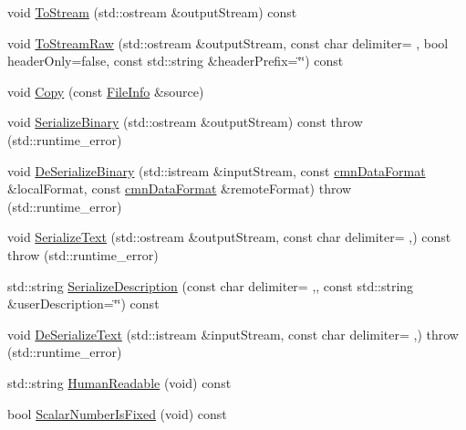 \begin{DoxyCompactItemize}
void \hyperlink{classsvl_filter_source_text_file_types_1_1_file_info_a74c475c29ecd42ea46fc55573ffb888d}{To\+Stream} (std\+::ostream \&output\+Stream) const 
\item 
void \hyperlink{classsvl_filter_source_text_file_types_1_1_file_info_a7bd65d4afd72c9a162758856e66ac8b3}{To\+Stream\+Raw} (std\+::ostream \&output\+Stream, const char delimiter= \textquotesingle{} \textquotesingle{}, bool header\+Only=false, const std\+::string \&header\+Prefix=\char`\"{}\char`\"{}) const 
\item 
void \hyperlink{classsvl_filter_source_text_file_types_1_1_file_info_a594b2dfddb6e172796a0e2141145ca3f}{Copy} (const \hyperlink{classsvl_filter_source_text_file_types_1_1_file_info}{File\+Info} \&source)
\item 
void \hyperlink{classsvl_filter_source_text_file_types_1_1_file_info_a6f38186e88fcb9cb7cc8d29e99177ff8}{Serialize\+Binary} (std\+::ostream \&output\+Stream) const   throw (std\+::runtime\+\_\+error)
\item 
void \hyperlink{classsvl_filter_source_text_file_types_1_1_file_info_aef7bce372a0de8b80258d84a84639e66}{De\+Serialize\+Binary} (std\+::istream \&input\+Stream, const \hyperlink{classcmn_data_format}{cmn\+Data\+Format} \&local\+Format, const \hyperlink{classcmn_data_format}{cmn\+Data\+Format} \&remote\+Format)  throw (std\+::runtime\+\_\+error)
\item 
void \hyperlink{classsvl_filter_source_text_file_types_1_1_file_info_ab9908fda5a000fa5bc53c619fa966695}{Serialize\+Text} (std\+::ostream \&output\+Stream, const char delimiter= \textquotesingle{},\textquotesingle{}) const   throw (std\+::runtime\+\_\+error)
\item 
std\+::string \hyperlink{classsvl_filter_source_text_file_types_1_1_file_info_aa8446c293a0cef1fb2d2174c35485fb4}{Serialize\+Description} (const char delimiter= \textquotesingle{},\textquotesingle{}, const std\+::string \&user\+Description=\char`\"{}\char`\"{}) const 
\item 
void \hyperlink{classsvl_filter_source_text_file_types_1_1_file_info_acb7c244072a4733f4ac0f008f621b33e}{De\+Serialize\+Text} (std\+::istream \&input\+Stream, const char delimiter= \textquotesingle{},\textquotesingle{})  throw (std\+::runtime\+\_\+error)
\item 
std\+::string \hyperlink{classsvl_filter_source_text_file_types_1_1_file_info_a558114c36915e0f533c1d170f02e3ecc}{Human\+Readable} (void) const 
\item 
bool \hyperlink{classsvl_filter_source_text_file_types_1_1_file_info_a35ac02eb4f0e7522b03ae6bba0dda347}{Scalar\+Number\+Is\+Fixed} (void) const 

\end{DoxyCompactItemize}
